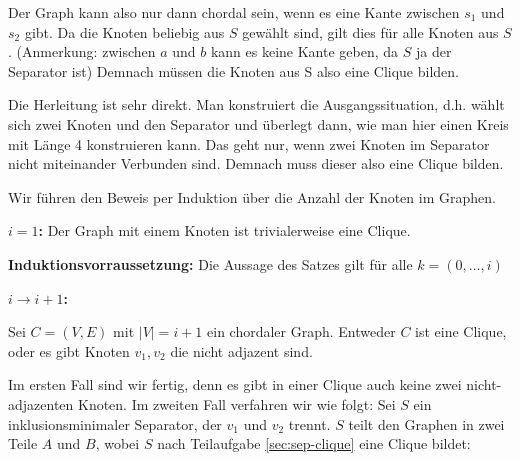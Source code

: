 Der Graph kann also nur dann chordal sein, wenn es eine Kante zwischen $s_1$ und $s_2$ gibt. Da die Knoten beliebig aus $S$ gewählt sind, gilt dies für alle Knoten aus $S$.
(Anmerkung: zwischen $a$ und $b$ kann es keine Kante geben, da $S$ ja der Separator ist)
Demnach müssen die Knoten aus S also eine Clique bilden.

\how

Die Herleitung ist sehr direkt. Man konstruiert die Ausgangssituation, d.h. wählt sich zwei Knoten und den Separator und überlegt dann, wie man hier einen Kreis mit Länge 4 konstruieren kann.
Das geht nur, wenn zwei Knoten im Separator nicht miteinander Verbunden sind. Demnach muss dieser also eine Clique bilden.

\subexercise

Wir führen den Beweis per Induktion über die Anzahl der Knoten im Graphen.

\textbf{$i = 1$:}
Der Graph mit einem Knoten ist trivialerweise eine Clique.

\textbf{Induktionsvorraussetzung:}
Die Aussage des Satzes gilt für alle $k = (0, \dots, i)$

\textbf{$i \rightarrow i + 1$:}

Sei $C = (V,E)$ mit $|V| = i + 1$ ein chordaler Graph.
Entweder $C$ ist eine Clique, oder es gibt Knoten $v_1, v_2$ die nicht adjazent sind.

Im ersten Fall sind wir fertig, denn es gibt in einer Clique auch keine zwei nicht-adjazenten Knoten. Im zweiten Fall verfahren wir wie folgt:
Sei $S$ ein inklusionsminimaler Separator, der $v_1$ und $v_2$ trennt.
$S$ teilt den Graphen in zwei Teile $A$ und $B$, wobei $S$ nach Teilaufgabe \ref{sec:sep-clique} eine Clique bildet:

